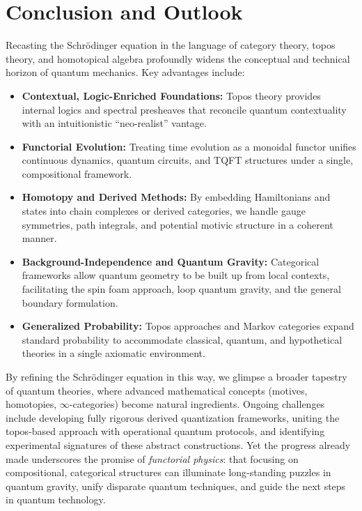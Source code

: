 \documentclass[12pt]{article}
\begin{document}
\section{Conclusion and Outlook}
Recasting the Schr\"odinger equation in the language of category
theory, topos theory, and homotopical algebra profoundly widens
the conceptual and technical horizon of quantum mechanics. Key
advantages include:

\begin{itemize}
\item \textbf{Contextual, Logic-Enriched Foundations:} Topos
theory provides internal logics and spectral presheaves that
reconcile quantum contextuality with an intuitionistic
``neo-realist'' vantage.
\item \textbf{Functorial Evolution:} Treating time evolution as
a monoidal functor unifies continuous dynamics, quantum circuits,
and TQFT structures under a single, compositional framework.
\item \textbf{Homotopy and Derived Methods:} By embedding
Hamiltonians and states into chain complexes or derived categories,
we handle gauge symmetries, path integrals, and potential motivic
structure in a coherent manner.
\item \textbf{Background-Independence and Quantum Gravity:}
Categorical frameworks allow quantum geometry to be built up from
local contexts, facilitating the spin foam approach, loop quantum
gravity, and the general boundary formulation.
\item \textbf{Generalized Probability:} Topos approaches and
Markov categories expand standard probability to accommodate
classical, quantum, and hypothetical theories in a single
axiomatic environment.
\end{itemize}

By refining the Schr\"odinger equation in this way, we glimpse a
broader tapestry of quantum theories, where advanced mathematical
concepts (motives, homotopies, $\infty$-categories) become natural
ingredients. Ongoing challenges include developing fully rigorous
derived quantization frameworks, uniting the topos-based approach
with operational quantum protocols, and identifying experimental
signatures of these abstract constructions. Yet the progress
already made underscores the promise of \emph{functorial physics}:
that focusing on compositional, categorical structures can illuminate
long-standing puzzles in quantum gravity, unify disparate quantum
techniques, and guide the next steps in quantum technology.
\end{document}
